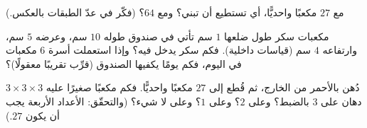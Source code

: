 \begin{exercise}[$\star$]\label{exo:g5:solids:8}
مع $27$ مكعبًا واحديًّا، أي  تستطيع أن تبني؟ ومع $64$؟ (فكّر في
عدّ الطبقات بالعكس.)
\end{exercise}

\begin{exercise}[$\star\star$]\label{exo:g5:solids:9}
مكعبات سكر طول ضلعها $1$ سم تأتي في صندوق طوله $10$ سم، وعرضه $5$ سم،
وارتفاعه $4$ سم (قياسات داخلية). فكم  سكر يدخل فيه؟ وإذا
استعملت أسرة $6$ مكعبات في اليوم، فكم يومًا يكفيها الصندوق
(قرِّب تقريبًا معقولًا)؟
\end{exercise}

\begin{exercise}[$\star\star$]\label{exo:g5:solids:10}
 $3 \times 3 \times 3$ دُهن بالأحمر من الخارج، ثم قُطع
إلى $27$ مكعبًا واحديًّا. فكم مكعبًا صغيرًا عليه دهان على
$3$  بالضبط؟ وعلى $2$؟ وعلى $1$؟ وعلى لا شيء؟ (والتحقّق: 
الأعداد الأربعة يجب أن يكون $27$.)
\end{exercise}

